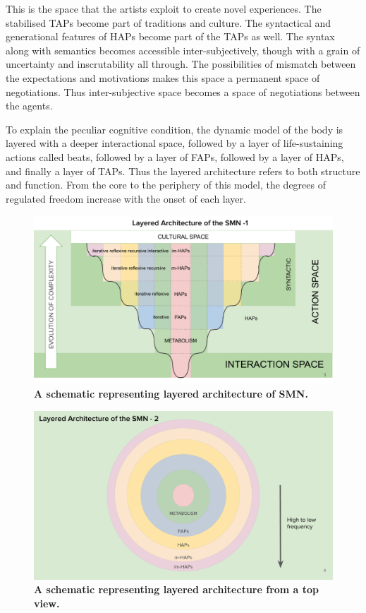 This is the space that the artists exploit to create novel experiences. The stabilised TAPs become part of traditions and culture. The syntactical and generational features of HAPs become part of the TAPs as well. The syntax along with semantics becomes accessible inter-subjectively, though with a grain of uncertainty and inscrutability all through. The possibilities of mismatch between the expectations and motivations makes this space a permanent space of negotiations. Thus inter-subjective space becomes a space of negotiations between the agents. 

To explain the peculiar cognitive condition, the dynamic model of the body is layered with a deeper interactional space, followed by a layer of life-sustaining actions called beats, followed by a layer of FAPs, followed by a layer of HAPs, and finally a layer of TAPs. Thus the layered architecture refers to both structure and function. From the core to the periphery of this model, the degrees of regulated freedom increase with the onset of each layer. 

\begin{figure}[ht] 
\includegraphics[width=\textwidth]{graphics/SideViewLayers.pdf}
\caption{\textbf{A schematic representing layered architecture of SMN.}}
\label{side_view_lSMN}
\end{figure}

\begin{figure}[ht] 
\includegraphics[width=\textwidth]{graphics/TopviewLayers.pdf}
\caption{\textbf{A schematic representing layered architecture from a top view.}}
\label{top_view_lSMN}
\end{figure}

